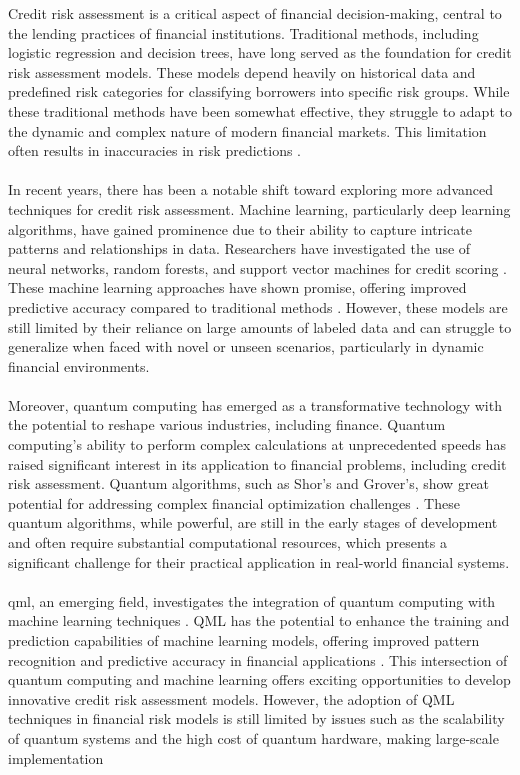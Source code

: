 \documentclass[a4paper]{article}
\begin{document}
Credit risk assessment is a critical aspect of financial decision-making, central to the lending practices of financial institutions. Traditional methods, including logistic regression and decision trees, have long served as the foundation for credit risk assessment models. These models depend heavily on historical data and predefined risk categories for classifying borrowers into specific risk groups. While these traditional methods have been somewhat effective, they struggle to adapt to the dynamic and complex nature of modern financial markets. This limitation often results in inaccuracies in risk predictions \cite{Marqués20131384}.\\\\In recent years, there has been a notable shift toward exploring more advanced techniques for credit risk assessment. Machine learning, particularly deep learning algorithms, have gained prominence due to their ability to capture intricate patterns and relationships in data. Researchers have investigated the use of neural networks, random forests, and support vector machines for credit scoring \cite{GOLBAYANI2020101251}. These machine learning approaches have shown promise, offering improved predictive accuracy compared to traditional methods \cite{thakkar2024improved} \cite{schuld2019quantum}. However, these models are still limited by their reliance on large amounts of labeled data and can struggle to generalize when faced with novel or unseen scenarios, particularly in dynamic financial environments.\\\\Moreover, quantum computing has emerged as a transformative technology with the potential to reshape various industries, including finance. Quantum computing's ability to perform complex calculations at unprecedented speeds has raised significant interest in its application to financial problems, including credit risk assessment. Quantum algorithms, such as Shor's and Grover's, show great potential for addressing complex financial optimization challenges \cite{Shor2002} \cite{Grover1996}. These quantum algorithms, while powerful, are still in the early stages of development and often require substantial computational resources, which presents a significant challenge for their practical application in real-world financial systems.\\\\ \gls{qml}, an emerging field, investigates the integration of quantum computing with machine learning techniques \cite{jha2020quantum} \cite{farhi2018classification}. QML has the potential to enhance the training and prediction capabilities of machine learning models, offering improved pattern recognition and predictive accuracy in financial applications \cite{lloyd2013quantum} \cite{Schuld2019}. This intersection of quantum computing and machine learning offers exciting opportunities to develop innovative credit risk assessment models. However, the adoption of QML techniques in financial risk models is still limited by issues such as the scalability of quantum systems and the high cost of quantum hardware, making large-scale implementation 
\end{document}
